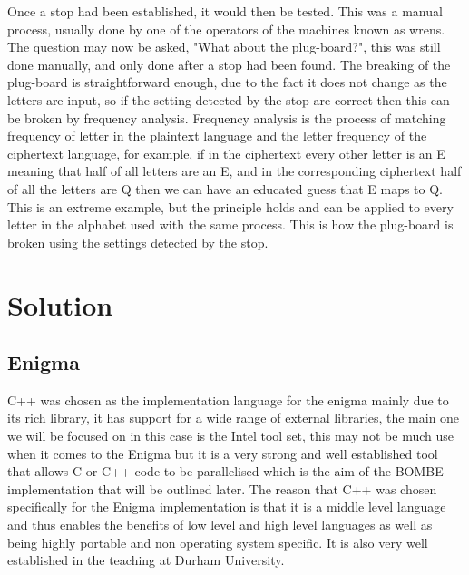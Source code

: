 \documentclass[12pt,a4paper]{article}
\begin{document}
Once a stop had been established, it would then be tested. This was a manual process, usually done by one of the operators of the machines known as wrens. The question may now be asked, "What about the plug-board?", this was still done manually, and only done after a stop had been found. The breaking of the plug-board is straightforward enough, due to the fact it does not change as the letters are input, so if the setting detected by the stop are correct then this can be broken by frequency analysis. Frequency analysis is the process of matching frequency of letter in the plaintext language and the letter frequency of the ciphertext language, for example, if in the ciphertext every other letter is an E meaning that half of all letters are an E, and in the corresponding ciphertext half of all the letters are Q then we can have an educated guess that E maps to Q. This is an extreme example, but the principle holds and can be applied to every letter in the alphabet used with the same process. This is how the plug-board is broken using the settings detected by the stop.

\section{Solution}

\subsection{Enigma}

C++ was chosen as the implementation language for the enigma mainly due to its rich library, it has support for a wide range of external libraries, the main one we will be focused on in this case is the Intel tool set, this may not be much use when it comes to the Enigma but it is a very strong and well established tool that allows C or C++ code to be parallelised which is the aim of the BOMBE implementation that will be outlined later. The reason that C++ was chosen specifically for the Enigma implementation is that it is a middle level language and thus enables the benefits of low level and high level languages as well as being highly portable and non operating system specific. It is also very well established in the teaching at Durham University.\\
\end{document}
